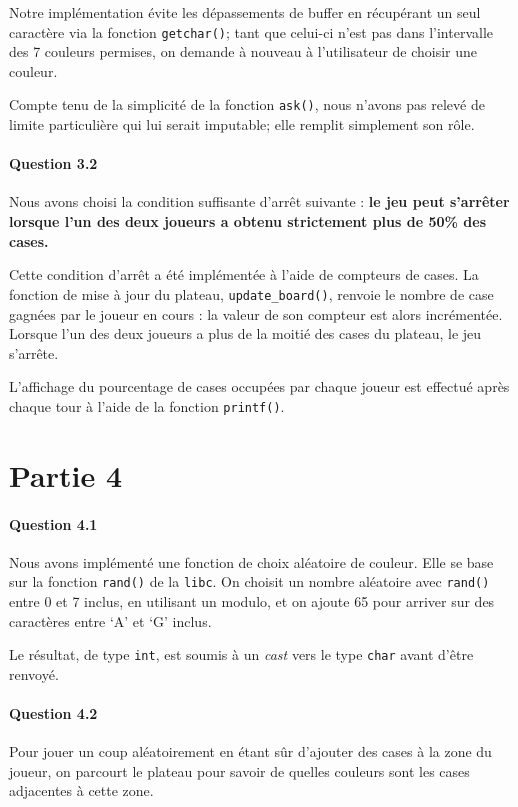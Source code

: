 \documentclass[a4paper]{article}
\begin{document}
Notre implémentation évite les dépassements de buffer en récupérant un seul 
caractère via la fonction \texttt{getchar()}; tant que celui-ci n'est pas dans 
l'intervalle des 7 couleurs permises, on demande à nouveau à l'utilisateur de 
choisir une couleur.

Compte tenu de la simplicité de la fonction \texttt{ask()}, nous n'avons pas 
relevé de limite particulière qui lui serait imputable; elle remplit simplement 
son rôle.
    \paragraph{Question 3.2}
    Nous avons choisi la condition suffisante d'arrêt suivante : \textbf{le jeu 
peut s'arrêter lorsque l'un des deux joueurs a obtenu strictement plus de 50\% 
des cases.}

Cette condition d'arrêt a été implémentée à l'aide de compteurs de cases. La 
fonction de mise à jour du plateau, \texttt{update\_board()}, renvoie le nombre 
de case gagnées par le joueur en cours : la valeur de son compteur est alors 
incrémentée. Lorsque l'un des deux joueurs a plus de la moitié des cases du 
plateau, le jeu s'arrête.

L'affichage du pourcentage de cases occupées par chaque joueur est effectué 
après chaque tour à l'aide de la fonction \texttt{printf()}.
    \section{Partie 4}
    \paragraph{Question 4.1} 
    Nous avons implémenté une fonction de choix aléatoire de couleur. Elle se 
base sur la fonction \texttt{rand()} de la \texttt{libc}. On choisit un nombre 
aléatoire avec \texttt{rand()} entre 0 et 7 inclus, en utilisant un modulo, et 
on ajoute 65 pour arriver sur des caractères entre `A' et `G' inclus. 

Le résultat, de type \texttt{int}, est soumis à un \emph{cast} vers le type 
\texttt{char} avant d'être renvoyé.

    \paragraph{Question 4.2} 
    Pour jouer un coup aléatoirement en étant sûr d'ajouter des cases à la 
zone du joueur, on parcourt le plateau pour savoir de quelles couleurs sont les 
cases adjacentes à cette zone. 
\end{document}
